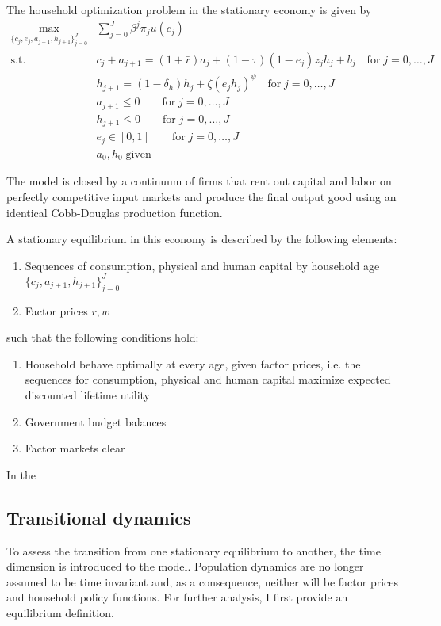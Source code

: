 The household optimization problem in the stationary economy is given by
\begin{align*}
    \max_{\{c_j, e_j, a_{j+1}, h_{j+1}\}_{j=0}^J} & \sum_{j=0}^J \beta^j \pi_{j} u(c_j) \\
    \text{s.t.} \;  & c_j + a_{j+1} = (1+\bar{r}) a_j + (1-\tau) (1-e_j) z_j h_j + b_j \quad\text{for}\; j=0,\dots,J \\
                    & h_{j+1} = (1-\delta_h) h_j + \zeta (e_j h_j)^\psi \quad\text{for}\; j=0,\dots,J \\
                    & a_{j+1} \leq 0 \quad \quad\text{for}\; j=0,\dots,J \\
                    & h_{j+1} \leq 0 \quad \quad\text{for}\; j=0,\dots,J \\
                    & e_j \in [0, 1] \quad \quad\text{for}\; j=0,\dots,J \\
                    & a_0, h_0 \;\text{given}
\end{align*}

The model is closed by a continuum of firms that rent out capital and labor on perfectly competitive input markets and produce the final output good using an identical Cobb-Douglas production function.

A stationary equilibrium in this economy is described by the following elements:
\begin{enumerate}
    \item Sequences of consumption, physical and human capital by household age $\{c_{j}, a_{j+1}, h_{j+1} \}_{j=0}^{J} $
    \item Factor prices $r, w$
\end{enumerate}
such that the following conditions hold:
\begin{enumerate}
    \item Household behave optimally at every age, given factor prices, i.e. the sequences for consumption, physical and human capital maximize expected discounted lifetime utility
    \item Government budget balances
    \item Factor markets clear
\end{enumerate}

In the

\subsection{Transitional dynamics}

To assess the transition from one stationary equilibrium to another, the time dimension is introduced to the model. Population dynamics are no longer assumed to be time invariant and, as a consequence, neither will be factor prices and household policy functions. For further analysis, I first provide an equilibrium definition.

